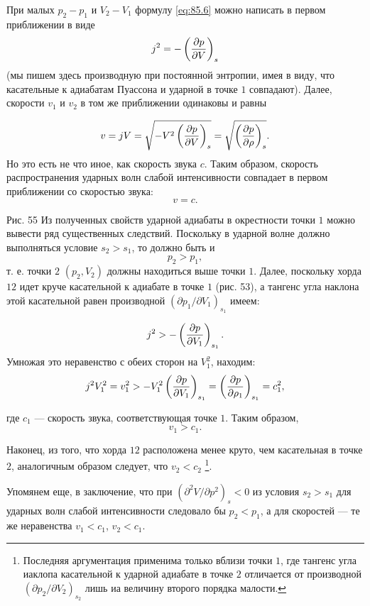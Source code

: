 При малых $p_2-p_1$ и $V_2-V_1$ формулу \ref{eq:85.6} можно написать в первом
приближении в виде
\[
	j^2=-\left( \frac{\partial{p}}{\partial{V}} \right)_{s}
\]
(мы пишем здесь производную при постоянной энтропии, имея в виду, что
касательные к адиабатам Пуассона и ударной в точке $1$ совпадают). Далее,
скорости $v_1$ и $v_2$ в том же приближении одинаковы и равны

\[
	v=jV=\sqrt{-V^2 \left( \frac{\partial{p}}{\partial{V}} \right)_{s}} = \sqrt{\left( \frac{\partial{p}}{\partial{\rho}} \right)_{s}}.
\]
Но это есть не что иное, как скорость звука $c$. Таким образом, скорость
распространения ударных волн слабой интенсивности совпадает в первом
приближении со скоростью звука:
\begin{equation}
	\label{eq:86.3}
	v = c.
\end{equation}

Рис. 55	Из полученных свойств ударной адиабаты в окрестности точки $1$ можно
вывести ряд существенных следствий. Поскольку в ударной волне должно
выполняться условие $s_2>s_1$, то должно быть и
\[
	p_2>p_1,
\]
т. е. точки $2$ $(p_2,V_2)$ должны находиться выше точки $1$. Далее, поскольку
хорда $12$ идет круче касательной к адиабате в точке $1$ (рис. 53), а тангенс
угла наклона этой касательной равен производной $(\partial p_1/\partial
V_1)_{s_1}$ имеем:

\[
	j^2>-\left( \frac{\partial{p}}{\partial{V_1}} \right)_{s_1}.
\]
Умножая это неравенство с обеих сторон на $V^2_1$, находим:
\[
	j^2 V^2_1 = v^2_1 > - V^2_1 \left( \frac{\partial{p}}{\partial{V_1}} \right)_{s_1} = \left( \frac{\partial{p}}{\partial{\rho_1}} \right)_{s_1} = c^2_1,
\]

где $c_1$ — скорость звука, соответствующая точке $1$. Таким образом,
\[
	v_1>c_1.
\]

Наконец, из того, что хорда $12$ расположена менее круто, чем касательная в
точке $2$, аналогичным образом следует, что $v_2<c_2$ \footnote{Последняя
аргументация применима только вблизи точки $1$, где тангенс угла иаклопа
касательной к ударной адиабате в точке $2$ отличается от производной $(\partial
p_2/\partial V_2)_{s_2}$ лишь иа величину второго порядка малости.}.

Упомянем еще, в заключение, что при $(\partial^2 V/\partial p^2)_s<0$ из
условия $s_2>s_1$ для ударных волн слабой интенсивности следовало бы $p_2<p_1$,
а для скоростей — те же неравенства $v_1<c_1$, $v_2<c_1$.
